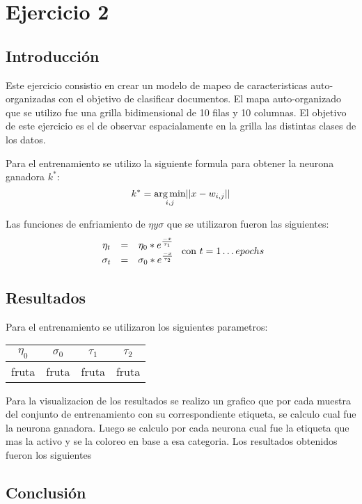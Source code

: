 \section{Ejercicio 2}

\subsection{Introducción}
Este ejercicio consistio en crear un modelo de mapeo de caracteristicas auto-organizadas con el objetivo de clasificar documentos. El mapa
auto-organizado que se utilizo fue una grilla bidimensional de 10 filas y 10 columnas. El objetivo de este ejercicio es el de observar espacialamente
en la grilla las distintas clases de los datos.

Para el entrenamiento se utilizo la siguiente formula para obtener la neurona ganadora $k^*$:
  \[
  k^* = \operatorname*{arg\,min}_{i,j} \lvert\lvert x-w_{i,j} \rvert\rvert
  \]

Las funciones de enfriamiento de $\eta y \sigma$ que se utilizaron fueron las siguientes:
\[
  \begin{array}{ccc}
    \eta_t & = & \eta_0 * e^{\frac{-x}{\tau_1}} \\
    \sigma_t & = & \sigma_0 * e^{\frac{-x}{\tau_2}} \\
  \end{array}
   \\ \mbox{                     con } t = 1 \dots epochs
\]
\subsection{Resultados}
Para el entrenamiento se utilizaron los siguientes parametros:
\begin{center}
  \begin{tabular}{|c|c|c|c|}
    \hline
    $\eta_0$ & $\sigma_0$ & $\tau_1$ & $\tau_2$ \\
    \hline
    fruta  & fruta & fruta & fruta \\
    \hline
  \end{tabular}
\end{center}

Para la visualizacion de los resultados se realizo un grafico que por cada muestra del conjunto de entrenamiento
 con su correspondiente etiqueta, se calculo cual fue la neurona ganadora. Luego se calculo por cada neurona cual fue la etiqueta
 que mas la activo y se la coloreo en base a esa categoria.
Los resultados obtenidos fueron los siguientes
\subsection{Conclusión}
